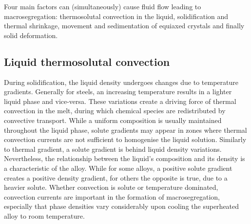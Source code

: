 Four main factors can (simultaneously) cause fluid flow leading to macrosegregation:
thermosolutal convection in the liquid, solidification and thermal shrinkage,
movement and sedimentation of equiaxed crystals and finally solid deformation.
%
\subsection{Liquid thermosolutal convection}
During solidification, the liquid density undergoes changes due to temperature gradients.
Generally for steels, an increasing temperature results in a lighter liquid phase and vice-versa.
These variations create a driving force of thermal convection in the melt, during which 
chemical species are redistributed by convective transport. While a uniform composition
is usually maintained throughout the liquid phase, solute gradients may appear in zones where
thermal convection currents are not sufficient to homogenise the liquid solution. 
Similarly to thermal gradient, a solute gradient is behind liquid density variations.
Nevertheless, the relationship between the liquid's composition and its density is a characteristic
of the alloy. While for some alloys, a positive solute gradient creates a positive density gradient,
for others the opposite is true, due to a heavier solute. Whether convection is solute or temperature
dominated, convection currents are important in the formation of macrosegregation, especially that 
phase densities vary considerably upon cooling the superheated alloy to room temperature.
%
%
